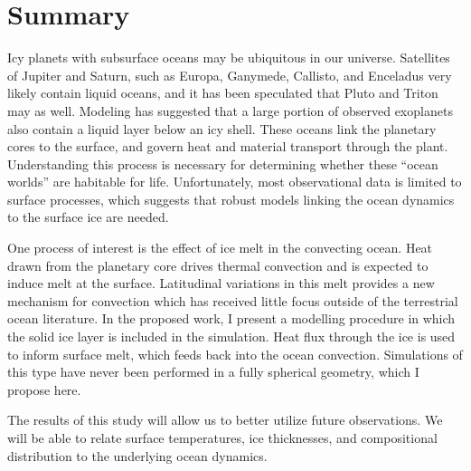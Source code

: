 \documentclass[12pt]{article}
\author{Tobias Oliver}
\date{}
\begin{document}
\newcommand{\citep}[1]{\cite{#1}}
\section*{Summary}
Icy planets with subsurface oceans may be ubiquitous in our universe. Satellites of Jupiter and Saturn, such as Europa, Ganymede, Callisto, and Enceladus very likely contain liquid oceans, and it has been speculated that Pluto and Triton may as well. Modeling has suggested that a large portion of observed exoplanets also contain a liquid layer below an icy shell.
These oceans link the planetary cores to the surface, and govern heat and material transport through the plant. Understanding this process is necessary for determining whether these ``ocean worlds'' are habitable for life.
Unfortunately, most observational data is limited to surface processes, which suggests that robust models linking the ocean dynamics to the surface ice are needed.

One process of interest is the effect of ice melt in the convecting ocean. 
Heat drawn from the planetary core drives thermal convection and is expected to induce melt at the surface. Latitudinal variations in this melt provides a new mechanism for convection which has received little focus outside of the terrestrial ocean literature. 
In the proposed work, I present a modelling procedure in which the solid ice layer is included in the simulation. 
Heat flux through the ice is used to inform surface melt, which feeds back into the ocean convection.
Simulations of this type have never been performed in a fully spherical geometry, which I propose here.

The results of this study will allow us to better utilize future observations. We will be able to relate surface temperatures, ice thicknesses, and compositional distribution to the underlying ocean dynamics.
%
\end{document}
